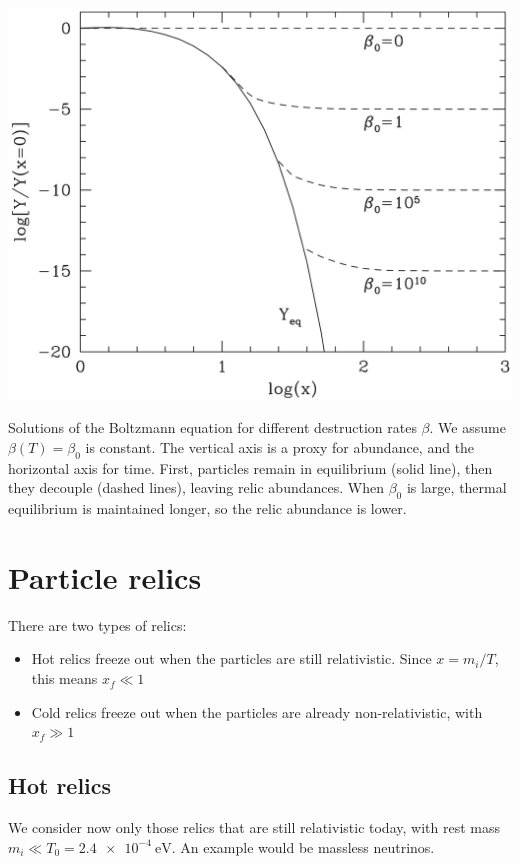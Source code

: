 \begin{marginfigure}
	\centering
	\includegraphics[width=\textwidth]{img/ch-02/boltzmann.png}
	\caption{Solutions of the Boltzmann equation for different destruction rates $\beta$. We assume $\beta(T) = \beta_0$ is constant. The vertical axis is a proxy for abundance, and the horizontal axis for time. First, particles remain in equilibrium (solid line), then they decouple (dashed lines), leaving relic abundances. When $\beta_0$ is large, thermal equilibrium is maintained longer, so the relic abundance is lower.}
	\label{fig:boltzmann}
\end{marginfigure}


\section{Particle relics}
There are two types of relics:
\begin{itemize}
	\item Hot relics freeze out when the particles are still relativistic. Since $x = m_i / T$, this means $x_f \ll 1$
	\item Cold relics freeze out when the particles are already non-relativistic, with $x_f \gg 1$
\end{itemize}

\subsection{Hot relics}
We consider now only those relics that are still relativistic today, with rest mass $m_i \ll T_0 = \SI{2.4e-4}{\eV}$. An example would be massless neutrinos.

